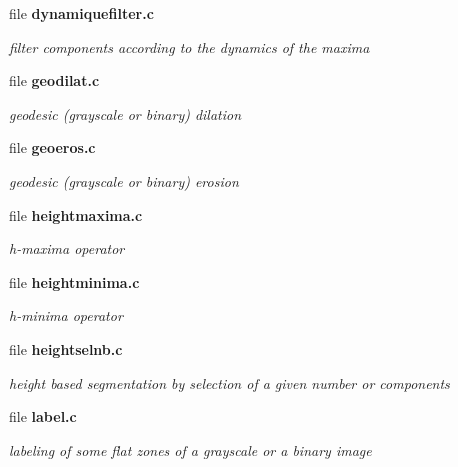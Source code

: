 \begin{CompactItemize}
\item 
file \bf{dynamiquefilter.c}
\begin{CompactList}\small\item\em filter components according to the dynamics of the maxima \item\end{CompactList}

\item 
file \bf{geodilat.c}
\begin{CompactList}\small\item\em geodesic (grayscale or binary) dilation \item\end{CompactList}

\item 
file \bf{geoeros.c}
\begin{CompactList}\small\item\em geodesic (grayscale or binary) erosion \item\end{CompactList}

\item 
file \bf{heightmaxima.c}
\begin{CompactList}\small\item\em h-maxima operator \item\end{CompactList}

\item 
file \bf{heightminima.c}
\begin{CompactList}\small\item\em h-minima operator \item\end{CompactList}

\item 
file \bf{heightselnb.c}
\begin{CompactList}\small\item\em height based segmentation by selection of a given number or components \item\end{CompactList}

\item 
file \bf{label.c}
\begin{CompactList}\small\item\em labeling of some flat zones of a grayscale or a binary image \item\end{CompactList}


\end{CompactItemize}
